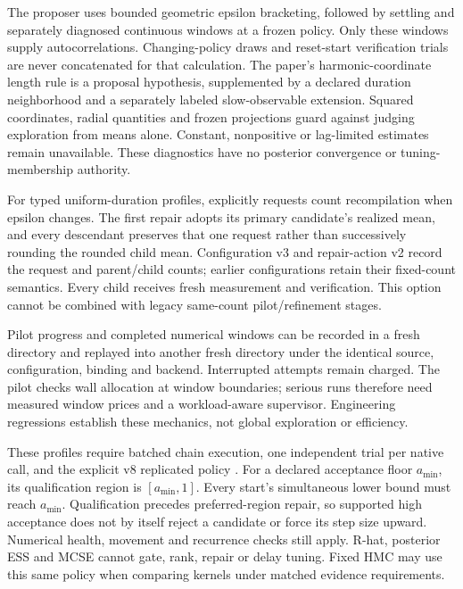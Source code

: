 The proposer uses bounded geometric epsilon bracketing, followed by settling
and separately diagnosed continuous windows at a frozen policy. Only these
windows supply autocorrelations. Changing-policy draws and reset-start
verification trials are never concatenated for that calculation. The paper's
harmonic-coordinate length rule is a proposal hypothesis, supplemented by a
declared duration neighborhood and a separately labeled slow-observable
extension. Squared coordinates, radial quantities and frozen projections
guard against judging exploration from means alone. Constant, nonpositive or
lag-limited estimates remain unavailable. These diagnostics have no posterior
convergence or tuning-membership authority.

For typed uniform-duration profiles,
 explicitly requests
count recompilation when epsilon changes. The first repair adopts its primary
candidate's realized mean, and every descendant preserves that one request
rather than successively rounding the rounded child mean. Configuration v3
and repair-action v2 record the request and parent/child counts; earlier
configurations retain their fixed-count semantics. Every child receives fresh
measurement and verification. This option cannot be combined with legacy
same-count pilot/refinement stages.

Pilot progress and completed numerical windows can be recorded in a fresh
directory and replayed into another fresh directory under the identical
source, configuration, binding and backend. Interrupted attempts remain charged.
The pilot checks wall allocation at window boundaries; serious runs therefore
need measured window prices and a workload-aware supervisor. Engineering
regressions establish these mechanics, not global exploration or efficiency.

These profiles require batched chain execution, one independent trial per
native call, and the explicit v8 replicated policy
. For a declared acceptance floor
$a_{\min}$, its qualification region is $[a_{\min},1]$. Every start's
simultaneous lower bound must reach $a_{\min}$. Qualification precedes
preferred-region repair, so supported high acceptance does not by itself
reject a candidate or force its step size upward. Numerical health, movement
and recurrence checks still apply. R-hat, posterior ESS and MCSE cannot gate,
rank, repair or delay tuning. Fixed HMC may use this same policy when comparing
kernels under matched evidence requirements.

